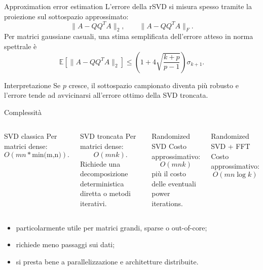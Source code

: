 \documentclass[10pt,aspectratio=169,handout]{beamer}
\begin{document}
\begin{frame}{Approximation error estimation}
L'errore della rSVD si misura spesso tramite la proiezione sul sottospazio approssimato:
\[
\|A-QQ^TA\|_2, \qquad \|A-QQ^TA\|_F.
\]
\pause
Per matrici gaussiane casuali, una stima semplificata dell'errore atteso in norma spettrale è
\[
\mathbb{E}\left[\|A-QQ^TA\|_2\right]
\leq
\left(1+4\sqrt{\frac{k+p}{p-1}}\right)\sigma_{k+1}.
\]
\begin{block}{Interpretazione}
Se $p$ cresce, il sottospazio campionato diventa più robusto e l'errore tende ad avvicinarsi all'errore ottimo della SVD troncata.
\end{block}
\end{frame}

\begin{frame}{Complessità}
\begin{columns}[T]
\begin{block}{SVD classica}
Per matrici dense:
\[
O(mn*\text{min(m,n)}).
\]
\end{block}
\begin{block}{SVD troncata}
Per matrici dense:
\[
O(mnk).
\]
Richiede una decomposizione deterministica diretta o metodi iterativi.
\end{block}
\begin{block}{Randomized SVD}
Costo approssimativo:
\[
O(mnk)
\]
più il costo delle eventuali power iterations.
\end{block}
\begin{block}{Randomized SVD + FFT}
Costo approssimativo:
\[
O(mn\log k)
\]
\end{block}

\end{columns}
\vspace{0.35cm}
\begin{itemize}
  \item particolarmente utile per matrici grandi, sparse o out-of-core;
  \item richiede meno passaggi sui dati;
  \item si presta bene a parallelizzazione e architetture distribuite.
\end{itemize}
\end{frame}
\end{document}
